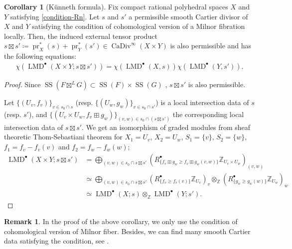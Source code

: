 \documentclass[a4paper,dvipdfmx,reqno,12pt]{amsart}
\theoremstyle{definition}
\newtheorem{corollary}[theorem]{Corollary}
\newtheorem{remark}[theorem]{Remark}
\newcommand{\deq}{\coloneqq}
\newcommand{\Z}{\mathbb{Z}}%
\newcommand{\opn}[1]{\operatorname{#1}}
\numberwithin{equation}{section}
\begin{document}
\begin{corollary}[{K\"unneth formula}]
Fix compact rational polyhedral spaces $X$ and $Y$
satisfying \cref{condition-Rn}.
Let $s$ and $s'$ a permissible smooth Cartier divisor of $X$ and $Y$ 
satisfying the condition of cohomological version of a Milnor 
fibration \cite[Assumption 1.1.1]{MR2031639} locally.
Then, the induced external tensor product 
$s\boxtimes s'\deq \opn{pr}_X^{*} (s)+\opn{pr}_Y^{*}(s')
\in \opn{CaDiv}^{\infty}(X\times Y)$ is also permissible and
has the following equations:
\begin{align}
\chi(\opn{LMD}^{\bullet}(X\times Y;s\boxtimes s'))=
\chi(\opn{LMD}^{\bullet}(X,s))\chi(\opn{LMD}^{\bullet}(Y,s')).
\end{align}

\end{corollary}
\begin{proof}
Since 
$\opn{SS}(F\boxtimes^{L} G)\subset 
\opn{SS}(F)\times \opn{SS}(G)$
\cite[Proposition 5.4.1]{MR1299726},
$s\boxtimes s'$ is also permissible.

Let $\{(U_v,f_v)\}_{v\in s_0\cap s}$
(resp. $\{(U_w,g_w)\}_{v\in s_0\cap s'}$) is a
local intersection data of $s$ (resp. $s'$), 
and $\{(U_{v}\times U_w,f_v\boxplus g_w)\}_{
(v,w)\in s_0 \cap 
(s\boxtimes s')}$ the 
corresponding local intersection data 
of $s\boxtimes s'$.  
We get an isomorphism of graded modules
from sheaf theoretic Thom-Sebastiani theorem for 
$X_1=U_{v}$, $X_2=U_w$, $S_1=\{v\}$, $S_2=\{w\}$,
$f_1= f_v-f_v(v)$ and 
$f_2= f_w-f_w(w)$;
\begin{align}
\opn{LMD}^{\bullet}(X\times Y;s\boxtimes s') 
& =\bigoplus_{(v,w)\in s_0\cap s\boxtimes s'}
(R^{\bullet}_{\{f_v\boxplus g_w\geq f_v\boxplus g_w(v,w)\}}
\Z_{U_{v}\times U_w})_{(v,w)} \\
& \simeq \bigoplus_{(v,w)\in s_0\cap s\boxtimes s'}
(R^{\bullet}_{\{f_v\geq f_v(v)\}}\Z_{U_v})_v
\otimes_{\Z} (R^{\bullet}_{\{g_w\geq g_w(w)\}}\Z_{U_w})_w \\
& \simeq
\opn{LMD}^{\bullet}(X;s)\otimes_{\Z} 
\opn{LMD}^{\bullet}(Y;s').
\end{align}

\end{proof}

\begin{remark}
In the proof of the above corollary, we only use
the condition of cohomological version of Milnor fiber. 
Besides, we can find many smooth Cartier data satisfying 
the condition, see \cite[p.35]{MR2031639}.  
\end{remark}
\end{document}
